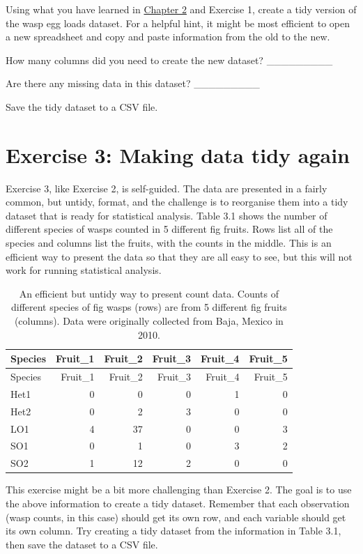 \documentclass[
]{scrbook}
\begin{document}
Using what you have learned in \protect\hyperlink{Chapter_2}{Chapter 2} and Exercise 1, create a tidy version of the wasp egg loads dataset.
For a helpful hint, it might be most efficient to open a new spreadsheet and copy and paste information from the old to the new.

How many columns did you need to create the new dataset? \_\_\_\_\_\_\_\_\_

Are there any missing data in this dataset? \_\_\_\_\_\_\_\_\_

Save the tidy dataset to a CSV file.

\hypertarget{exercise-3-making-data-tidy-again}{%
\section{Exercise 3: Making data tidy again}\label{exercise-3-making-data-tidy-again}}

Exercise 3, like Exercise 2, is self-guided.
The data are presented in a fairly common, but untidy, format, and the challenge is to reorganise them into a tidy dataset that is ready for statistical analysis.
Table 3.1 shows the number of different species of wasps counted in 5 different fig fruits.
Rows list all of the species and columns list the fruits, with the counts in the middle.
This is an efficient way to present the data so that they are all easy to see, but this will not work for running statistical analysis.

\begin{longtable}[]{@{}lrrrrr@{}}
\caption{\label{tab:unnamed-chunk-17}An efficient but untidy way to present count data. Counts of different species of fig wasps (rows) are from 5 different fig fruits (columns). Data were originally collected from Baja, Mexico in 2010.}\tabularnewline
\toprule
Species & Fruit\_1 & Fruit\_2 & Fruit\_3 & Fruit\_4 & Fruit\_5 \\
\midrule
\endfirsthead
\toprule
Species & Fruit\_1 & Fruit\_2 & Fruit\_3 & Fruit\_4 & Fruit\_5 \\
\midrule
\endhead
Het1 & 0 & 0 & 0 & 1 & 0 \\
Het2 & 0 & 2 & 3 & 0 & 0 \\
LO1 & 4 & 37 & 0 & 0 & 3 \\
SO1 & 0 & 1 & 0 & 3 & 2 \\
SO2 & 1 & 12 & 2 & 0 & 0 \\
\bottomrule
\end{longtable}

This exercise might be a bit more challenging than Exercise 2.
The goal is to use the above information to create a tidy dataset.
Remember that each observation (wasp counts, in this case) should get its own row, and each variable should get its own column.
Try creating a tidy dataset from the information in Table 3.1, then save the dataset to a CSV file.
\end{document}
